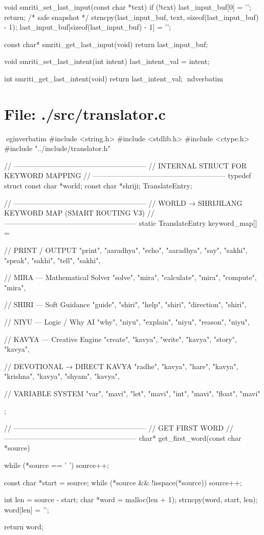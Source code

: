 \documentclass{article}
\begin{document}
void smriti_set_last_input(const char *text)
{
    if (!text)
    {
        last_input_buf[0] = '\0';
        return;
    }
    /* safe snapshot */
    strncpy(last_input_buf, text, sizeof(last_input_buf) - 1);
    last_input_buf[sizeof(last_input_buf) - 1] = '\0';
}

const char* smriti_get_last_input(void)
{
    return last_input_buf;
}

void smriti_set_last_intent(int intent)
{
    last_intent_val = intent;
}

int smriti_get_last_intent(void)
{
    return last_intent_val;
}
nd{verbatim}
\section*{File: ./src/translator.c}
egin{verbatim}
#include <string.h>
#include <stdlib.h>
#include <ctype.h>
#include "../include/translator.h"

// --------------------------------------------------------
// INTERNAL STRUCT FOR KEYWORD MAPPING
// --------------------------------------------------------
typedef struct {
    const char *world;
    const char *shriji;
} TranslateEntry;

// --------------------------------------------------------
// WORLD → SHRIJILANG KEYWORD MAP (SMART ROUTING V3)
// --------------------------------------------------------
static TranslateEntry keyword_map[] = {

    // PRINT / OUTPUT
    {"print", "aaradhya"},
    {"echo", "aaradhya"},
    {"say", "sakhi"},
    {"speak", "sakhi"},
    {"tell", "sakhi"},

    // MIRA — Mathematical Solver
    {"solve", "mira"},
    {"calculate", "mira"},
    {"compute", "mira"},

    // SHIRI — Soft Guidance
    {"guide", "shiri"},
    {"help", "shiri"},
    {"direction", "shiri"},

    // NIYU — Logic / Why AI
    {"why", "niyu"},
    {"explain", "niyu"},
    {"reason", "niyu"},

    // KAVYA — Creative Engine
    {"create", "kavya"},
    {"write", "kavya"},
    {"story", "kavya"},

    // DEVOTIONAL → DIRECT KAVYA
    {"radhe", "kavya"},
    {"hare", "kavya"},
    {"krishna", "kavya"},
    {"shyam", "kavya"},

    // VARIABLE SYSTEM
    {"var", "mavi"},
    {"let", "mavi"},
    {"int", "mavi"},
    {"float", "mavi"}
};

// --------------------------------------------------------
// GET FIRST WORD
// --------------------------------------------------------
char* get_first_word(const char *source) {
    while (*source == ' ') source++;

    const char *start = source;
    while (*source && !isspace(*source))
        source++;

    int len = source - start;
    char *word = malloc(len + 1);
    strncpy(word, start, len);
    word[len] = '\0';

    return word;
}
\end{document}
